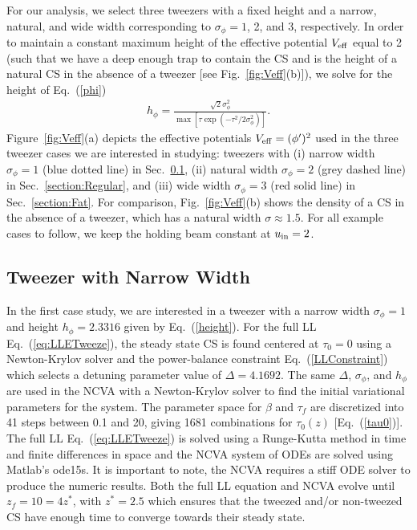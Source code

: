 For our analysis, we select three tweezers with a fixed height and a narrow, natural, and wide width corresponding to $\sigma_\phi = 1$, 2, and 3, respectively.  In order to maintain a constant maximum height of the effective potential $V_{\rm eff}$ equal to 2 (such that we have a deep enough trap to contain the CS and is the height of a natural CS in the absence of a tweezer [see Fig.~\ref{fig:Veff}(b)]), we solve for the height of Eq.~(\ref{phi}) 
\begin{align}
h_\phi = \frac{\sqrt{2} \sigma_{\phi}^2}{\max [\tau \exp(-\tau^2/2\sigma_{\phi}^2)]}.
\label{height}
\end{align}
Figure~\ref{fig:Veff}(a) depicts the effective potentials $V_{\rm eff} = (\phi')^2$ used in the three tweezer cases we are interested in studying: tweezers with (i) narrow width $\sigma_\phi = 1$ (blue dotted line) in Sec.~\ref{section:Skinny}, (ii) natural width $\sigma_\phi = 2$ (grey dashed line) in Sec.~\ref{section:Regular}, and (iii) wide width $\sigma_\phi = 3$ (red solid line) in Sec.~\ref{section:Fat}.  For comparison, Fig.~\ref{fig:Veff}(b) shows the density of a CS in the absence of a tweezer, which has a natural width $\sigma \approx 1.5$.  For all example cases to follow, we keep the holding beam constant at $u_{\rm in} = 2$.

\subsection[Tweezer with Narrow Width]{Tweezer with Narrow Width} \label{section:Skinny}

In the first case study, we are interested in a tweezer with a narrow width $\sigma_\phi = 1$ and height $h_\phi = 2.3316$ given by Eq.~(\ref{height}).  For the full LL Eq.~(\ref{eq:LLETweeze}), the steady state CS is found centered at $\tau_0 = 0$ using a Newton-Krylov solver and the power-balance constraint Eq.~(\ref{LLConstraint}) which selects a detuning parameter value of $\Delta =  4.1692$.  The same $\Delta$, $\sigma_\phi$, and $h_\phi$ are used in the NCVA with a Newton-Krylov solver to find the initial variational parameters for the system.  The parameter space for $\beta$ and $\tau_f$ are discretized into 41 steps between 0.1 and 20, giving 1681 combinations for $\tau_0(z)$ [Eq.~(\ref{tau0})].    The full LL Eq.~(\ref{eq:LLETweeze}) is solved using a Runge-Kutta method in time and finite differences in space  and the NCVA system of ODEs are solved using Matlab's ode15s.  It is important to note, the NCVA requires a stiff ODE solver to produce the numeric results. 
Both the full LL equation and NCVA evolve until $z_f = 10 = 4z^*$, with $z^* = 2.5$ which ensures that the tweezed and/or non-tweezed CS have enough time to converge towards their steady state. 

